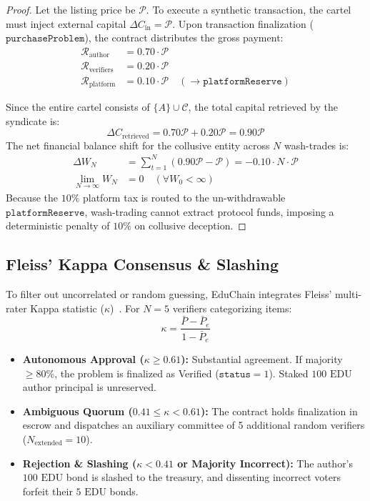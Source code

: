\documentclass[conference,10pt]{IEEEtran}
\begin{document}
\begin{proof}
Let the listing price be $\mathcal{P}$. To execute a synthetic transaction, the cartel must inject external capital $\Delta C_{\text{in}} = \mathcal{P}$. Upon transaction finalization ($\mathtt{purchaseProblem}$), the contract distributes the gross payment:
\begin{align}
    \mathcal{R}_{\text{author}} &= 0.70 \cdot \mathcal{P} \\
    \mathcal{R}_{\text{verifiers}} &= 0.20 \cdot \mathcal{P} \\
    \mathcal{R}_{\text{platform}} &= 0.10 \cdot \mathcal{P} \quad (\to \mathtt{platformReserve})
\end{align}

Since the entire cartel consists of $\{A\} \cup \mathcal{C}$, the total capital retrieved by the syndicate is:
\begin{equation}
    \Delta C_{\text{retrieved}} = 0.70\mathcal{P} + 0.20\mathcal{P} = 0.90\mathcal{P}
\end{equation}
The net financial balance shift for the collusive entity across $N$ wash-trades is:
\begin{align}
    \Delta W_N &= \sum_{t=1}^N (0.90\mathcal{P} - \mathcal{P}) = -0.10 \cdot N \cdot \mathcal{P} \\
    \lim_{N \to \infty} W_N &= 0 \quad (\forall W_0 < \infty)
\end{align}
Because the $10\%$ platform tax is routed to the un-withdrawable $\mathtt{platformReserve}$, wash-trading cannot extract protocol funds, imposing a deterministic penalty of $10\%$ on collusive deception.
\end{proof}

\subsection{Fleiss' Kappa Consensus \& Slashing}
To filter out uncorrelated or random guessing, EduChain integrates Fleiss' multi-rater Kappa statistic ($\kappa$)~\cite{fleiss1971measuring}. For $N = 5$ verifiers categorizing items:
\begin{equation}
    \kappa = \frac{\bar{P} - \bar{P}_e}{1 - \bar{P}_e}
\end{equation}
\begin{itemize}
    \item \textbf{Autonomous Approval ($\kappa \ge 0.61$):} Substantial agreement. If majority $\ge 80\%$, the problem is finalized as Verified ($\mathtt{status} = 1$). Staked $100\text{ EDU}$ author principal is unreserved.
    \item \textbf{Ambiguous Quorum ($0.41 \le \kappa < 0.61$):} The contract holds finalization in escrow and dispatches an auxiliary committee of 5 additional random verifiers ($N_{\text{extended}} = 10$).
    \item \textbf{Rejection \& Slashing ($\kappa < 0.41$ or Majority Incorrect):} The author's $100\text{ EDU}$ bond is slashed to the treasury, and dissenting incorrect voters forfeit their $5\text{ EDU}$ bonds.
\end{itemize}
\end{document}
